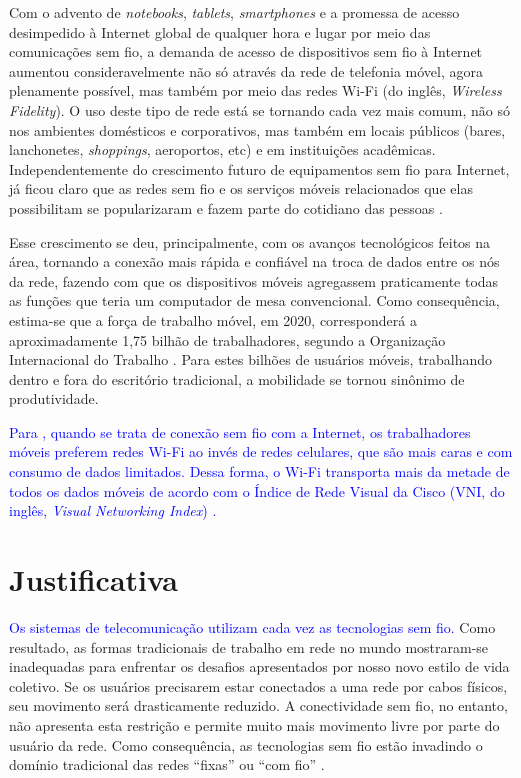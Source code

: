 Com o advento de \textit{notebooks}, \textit{tablets}, \textit{smartphones} e a promessa de acesso desimpedido à Internet global de qualquer hora e lugar por meio das comunicações sem fio, a demanda de acesso de dispositivos sem fio à Internet aumentou consideravelmente não só através da rede de telefonia móvel, agora plenamente possível, mas também por meio das redes Wi-Fi (do inglês, \textit{Wireless Fidelity}). O uso deste tipo de rede está se tornando cada vez mais comum, não só nos ambientes domésticos e corporativos, mas também em locais públicos (bares, lanchonetes, \textit{shoppings}, aeroportos, etc) e em instituições acadêmicas. Independentemente do crescimento futuro de equipamentos sem fio para Internet, já ficou claro que as redes sem fio e os serviços móveis relacionados que elas possibilitam se popularizaram e fazem parte do cotidiano das pessoas \cite{gast2002,kurose2013}.

Esse crescimento se deu, principalmente, com os avanços tecnológicos feitos na área, tornando a conexão mais rápida e confiável na troca de dados entre os nós da rede, fazendo com que os dispositivos móveis agregassem praticamente todas as funções que teria um computador de mesa convencional. Como consequência, estima-se que a força de trabalho móvel, em 2020, corresponderá a aproximadamente 1,75 bilhão de trabalhadores, segundo a Organização Internacional do Trabalho \cite{wba2017}. Para estes bilhões de usuários móveis, trabalhando dentro e fora do escritório tradicional, a mobilidade se tornou sinônimo de produtividade.

\textcolor{blue}{Para \cite{wba2017}, quando se trata de conexão sem fio com a Internet, os trabalhadores móveis preferem redes Wi-Fi ao invés de redes celulares, que são mais caras e com consumo de dados limitados. Dessa forma, o Wi-Fi transporta mais da metade de todos os dados móveis de acordo com o Índice de Rede Visual da Cisco (VNI, do inglês, \textit{Visual Networking Index}) \cite{wba2017}.}

\section{Justificativa}
\label{sec:justificativa}

\textcolor{blue}{Os sistemas de telecomunicação utilizam cada vez as tecnologias sem fio.} Como resultado, as formas tradicionais de trabalho em rede no mundo mostraram-se inadequadas para enfrentar os desafios apresentados por nosso novo estilo de vida coletivo. Se os usuários precisarem estar conectados a uma rede por cabos físicos, seu movimento será drasticamente reduzido. A conectividade sem fio, no entanto, não apresenta esta restrição e permite muito mais movimento livre por parte do usuário da rede. Como consequência, as tecnologias sem fio estão invadindo o domínio tradicional das redes ``fixas'' ou ``com fio'' \cite{gast2002}.

